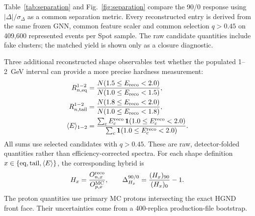 \documentclass[11pt,a4paper]{article}
\begin{document}
Table~\ref{tab:separation} and Fig.~\ref{fig:separation} compare the 90/0
response using $|\Delta|/\sigma_\Delta$ as a common separation metric.  Every
reconstructed entry is derived from the same frozen GNN, common feature scaler
and common selection $q>0.45$ on 409,600 represented events per Spot sample.
The raw candidate quantities include fake clusters; the matched yield is shown
only as a closure diagnostic.

Three additional reconstructed shape observables test whether the populated
1--2~GeV interval can provide a more precise hardness measurement:
\begin{align*}
 R_{n,{\rm eq}}^{1-2}
 &=\frac{N(1.5\leq E_{\rm reco}<2.0)}
          {N(1.0\leq E_{\rm reco}<1.5)},\\
 R_{n,{\rm tail}}^{1-2}
 &=\frac{N(1.8\leq E_{\rm reco}<2.0)}
          {N(1.0\leq E_{\rm reco}<1.8)},\\
 \langle E\rangle_{1-2}
 &=\frac{\sum_c E_c^{\rm reco}\,
          \mathbf{1}(1.0\leq E_c^{\rm reco}<2.0)}
         {\sum_c\mathbf{1}(1.0\leq E_c^{\rm reco}<2.0)}.
\end{align*}
All sums use selected candidates with $q>0.45$.  These are raw,
detector-folded quantities rather than efficiency-corrected spectra.
For each shape definition
$x\in\{{\rm eq},{\rm tail},\langle E\rangle\}$, the corresponding hybrid is
\[
 H_x=\frac{O_{n,x}^{\rm reco}}{O_{p,x}^{\rm MC}},\qquad
 \Delta_{H_x}^{90/0}=\frac{(H_x)_{90}}{(H_x)_0}-1.
\]
The proton quantities use primary MC protons intersecting the exact HGND front
face.  Their uncertainties come from a 400-replica production-file bootstrap.
\end{document}
